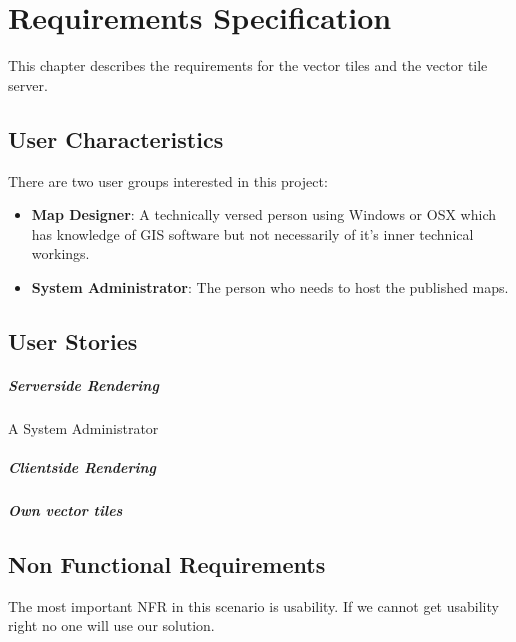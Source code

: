 \chapter{Requirements Specification}
\label{requirements-specification}

This chapter describes the requirements for the vector tiles and the vector tile server.

\section{User Characteristics}
\label{user-characteristics}

There are two user groups interested in this project:

\begin{itemize}
\item
  \textbf{Map Designer}: A technically versed person using Windows or
  OSX which has knowledge of GIS software but not necessarily of it's
  inner technical workings.
\item
  \textbf{System Administrator}: The person who needs to host the
  published maps.
\end{itemize}

\section{User Stories}
\label{user-stories}
\paragraph{Serverside Rendering}
A System Administrator

\paragraph{Clientside Rendering}


\paragraph{Own vector tiles}


\section{Non Functional Requirements}
\label{non-functional-requirements}

The most important NFR in this scenario is usability. If we cannot get
usability right no one will use our solution.

